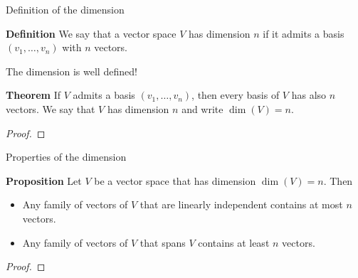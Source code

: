 \documentclass{beamer}
\begin{document}
\begin{frame}[t]{Definition of the dimension}
	\grid
	\begin{block}{\bf Definition}
		We say that a vector space $V$ has dimension $n$ if it admits a basis $(v_1, \dots, v_n)$ with $n$ vectors.
	\end{block}
\end{frame}

\begin{frame}[t]{The dimension is well defined!}
	\grid
	\begin{block}{\bf Theorem}
		If $V$ admits a basis $(v_1, \dots, v_n)$, then every basis of $V$ has also $n$ vectors. We say that $V$ has dimension $n$ and write $\dim(V) = n$.
	\end{block}
	\begin{proof}
		\vspace{3cm}
		\vfill
	\end{proof}
\end{frame}

\begin{frame}[t]{Properties of the dimension}
	\grid
	\vspace{-0.4cm}
	\begin{block}{\bf Proposition}
		Let $V$ be a vector space that has dimension $\dim(V) = n$. Then
		\begin{itemize}
			\item Any family of vectors of $V$ that are linearly independent contains at most $n$ vectors.
			\item Any family of vectors of $V$ that spans $V$ contains at least $n$ vectors.
		\end{itemize}
	\end{block}
	\begin{proof}
		\vspace{2cm}
		\vfill
	\end{proof}
	\pause
\end{frame}
\end{document}
